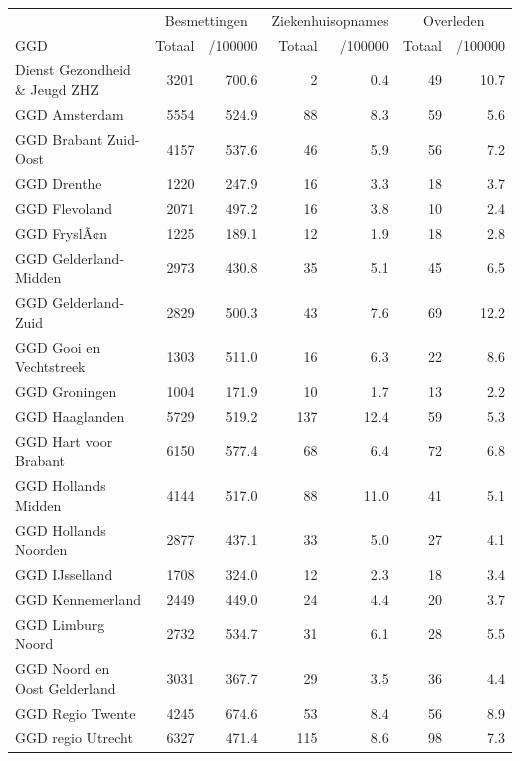 \documentclass[
  english,
  man,floatsintext]{apa6}
\begin{document}
\begin{table}[H]
\centering\begingroup\fontsize{10}{12}\selectfont

\begin{threeparttable}
\begin{tabular}{lrrrrrr}
\toprule
\multicolumn{1}{c}{ } & \multicolumn{2}{c}{Besmettingen} & \multicolumn{2}{c}{Ziekenhuisopnames} & \multicolumn{2}{c}{Overleden} \\
\cmidrule(l{3pt}r{3pt}){2-3} \cmidrule(l{3pt}r{3pt}){4-5} \cmidrule(l{3pt}r{3pt}){6-7}
GGD & Totaal & /100000 & Totaal & /100000 & Totaal & /100000\\
\midrule
Dienst Gezondheid \& Jeugd ZHZ & 3201 & 700.6 & 2 & 0.4 & 49 & 10.7\\
GGD Amsterdam & 5554 & 524.9 & 88 & 8.3 & 59 & 5.6\\
GGD Brabant Zuid-Oost & 4157 & 537.6 & 46 & 5.9 & 56 & 7.2\\
GGD Drenthe & 1220 & 247.9 & 16 & 3.3 & 18 & 3.7\\
GGD Flevoland & 2071 & 497.2 & 16 & 3.8 & 10 & 2.4\\
GGD FryslÃ¢n & 1225 & 189.1 & 12 & 1.9 & 18 & 2.8\\
GGD Gelderland-Midden & 2973 & 430.8 & 35 & 5.1 & 45 & 6.5\\
GGD Gelderland-Zuid & 2829 & 500.3 & 43 & 7.6 & 69 & 12.2\\
GGD Gooi en Vechtstreek & 1303 & 511.0 & 16 & 6.3 & 22 & 8.6\\
GGD Groningen & 1004 & 171.9 & 10 & 1.7 & 13 & 2.2\\
GGD Haaglanden & 5729 & 519.2 & 137 & 12.4 & 59 & 5.3\\
GGD Hart voor Brabant & 6150 & 577.4 & 68 & 6.4 & 72 & 6.8\\
GGD Hollands Midden & 4144 & 517.0 & 88 & 11.0 & 41 & 5.1\\
GGD Hollands Noorden & 2877 & 437.1 & 33 & 5.0 & 27 & 4.1\\
GGD IJsselland & 1708 & 324.0 & 12 & 2.3 & 18 & 3.4\\
GGD Kennemerland & 2449 & 449.0 & 24 & 4.4 & 20 & 3.7\\
GGD Limburg Noord & 2732 & 534.7 & 31 & 6.1 & 28 & 5.5\\
GGD Noord en Oost Gelderland & 3031 & 367.7 & 29 & 3.5 & 36 & 4.4\\
GGD Regio Twente & 4245 & 674.6 & 53 & 8.4 & 56 & 8.9\\
GGD regio Utrecht & 6327 & 471.4 & 115 & 8.6 & 98 & 7.3\\

\end{tabular}
\end{threeparttable}
\end{table}
\end{document}
